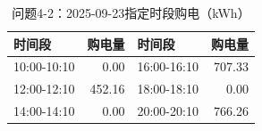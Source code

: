 \begin{table}[H]\centering\small\caption{问题4-2：2025-09-23指定时段购电（kWh）}\label{tab:q4_220250923p}
\begin{tabular}{lrlr}\toprule
时间段 & 购电量 & 时间段 & 购电量\\\midrule
10:00-10:10 & 0.00 & 16:00-16:10 & 707.33\\
12:00-12:10 & 452.16 & 18:00-18:10 & 0.00\\
14:00-14:10 & 0.00 & 20:00-20:10 & 766.26\\
\bottomrule\end{tabular}\end{table}

